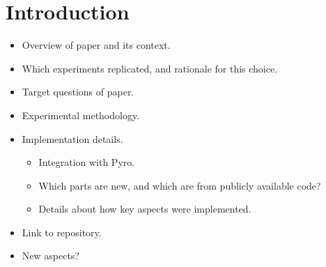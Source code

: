 
\section{Introduction}

\begin{itemize}
    \item Overview of paper and its context.
    \item Which experiments replicated, and rationale for this choice.
    \item Target questions of paper.
    \item Experimental methodology.
    \item Implementation details.
    \begin{itemize}
        \item Integration with Pyro.
        \item Which parts are new, and which are from publicly available code?
        \item Details about how key aspects were implemented.
    \end{itemize}
    \item Link to repository.
    \item New aspects?
\end{itemize}